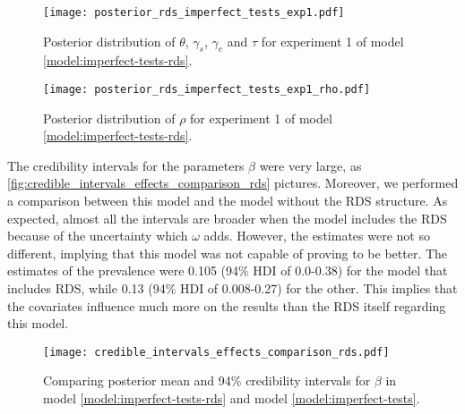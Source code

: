\begin{figure}
  \centering
  \caption{\label{fig:posterior_rds_imperfect_tests_exp1}Posterior distribution of
    $\theta$, $\gamma_s$, $\gamma_e$ and $\tau$ for experiment 1 of model
    \eqref{model:imperfect-tests-rds}.}
  \texttt{[image: posterior\_rds\_imperfect\_tests\_exp1.pdf]}
\end{figure}

\begin{figure}
  \centering
  \caption{\label{fig:posterior_rds_imperfect_tests_exp1_rho}Posterior distribution of
    $\rho$ for experiment 1 of model \eqref{model:imperfect-tests-rds}.}
  \texttt{[image: posterior\_rds\_imperfect\_tests\_exp1\_rho.pdf]}
\end{figure}

The credibility intervals for the parameters $\beta$ were very large, as
\autoref{fig:credible_intervals_effects_comparison_rds} pictures. Moreover, we
performed
a comparison between this model and the model without the RDS structure. As
expected, almost all the intervals are broader when the model includes the RDS
because of the uncertainty which $\omega$ adds. However, the estimates were
not so different, implying that this model was not capable of proving to be
better. The estimates of the prevalence were 0.105 (94\% HDI of 0.0-0.38) for
the model that includes RDS, while 0.13 (94\% HDI of 0.008-0.27) for the
other. This implies that the covariates influence much more on the results 
than the RDS itself regarding this model. 

\begin{figure}
  \centering
  \caption{\label{fig:credible_intervals_effects_comparison_rds}Comparing
  posterior mean and 94\% credibility intervals for $\beta$ in model
  \eqref{model:imperfect-tests-rds} and model \eqref{model:imperfect-tests}.}
  \texttt{[image: credible\_intervals\_effects\_comparison\_rds.pdf]}
\end{figure}

